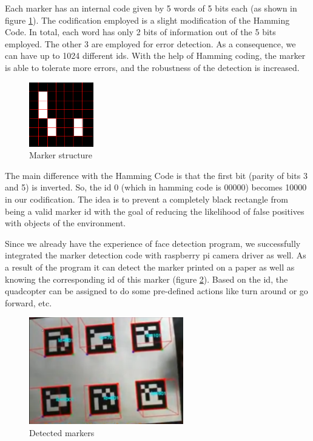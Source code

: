 \documentclass[11pt, a4paper, onecolumn, oneside, parskip=half]{scrartcl}
\begin{document}
Each marker has an internal code given by 5 words of 5 bits each (as shown in figure \ref{fig:markerstructure}). The codification employed is a slight modification of the Hamming Code. In total, each word has only 2 bits of information out of the 5 bits employed. The other 3 are employed for error detection. As a consequence, we can have up to 1024 different ids. With the help of Hamming coding, the marker is able to tolerate more errors, and the robustness of the detection is increased.

\begin{figure}[ht]
\centering
\includegraphics[width=0.25\textwidth]{image04}
\caption{Marker structure}
\label{fig:markerstructure}
\end{figure}

The main difference with the Hamming Code is that the first bit (parity of bits 3 and 5) is inverted. So, the id 0 (which in hamming code is 00000) becomes 10000 in our codification. The idea is to prevent a completely black rectangle from being a valid marker id with the goal of reducing the likelihood of false positives with objects of the environment.

Since we already have the experience of face detection program, we successfully integrated the marker detection code with raspberry pi camera driver as well. As a result of the program it can detect the marker printed on a paper as well as knowing the corresponding id of this marker (figure \ref{fig:markerdetected}). Based on the id, the quadcopter can be assigned to do some pre-defined actions like turn around or go forward, etc.

\begin{figure}[ht]
\centering
\includegraphics[width=0.6\textwidth]{image05}
\caption{Detected markers}
\label{fig:markerdetected}
\end{figure}
\end{document}
